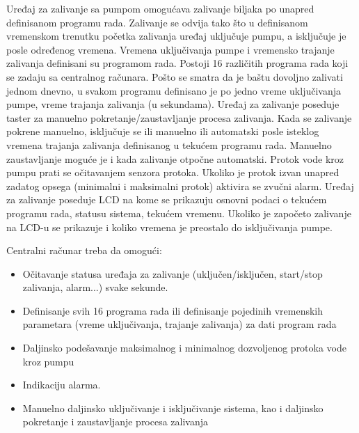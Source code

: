 \documentclass[12pt]{article}
\numberwithin{figure}{section}
\begin{document}
Uređaj za zalivanje sa pumpom omogućava zalivanje biljaka po unapred definisanom programu rada. 
Zalivanje se odvija tako što u definisanom vremenskom trenutku početka zalivanja uređaj uključuje pumpu, a isključuje je posle određenog vremena. 
Vremena uključivanja pumpe i vremensko trajanje zalivanja definisani su programom rada. 
Postoji 16 različitih programa rada koji se zadaju sa centralnog računara.
Pošto se smatra da je baštu dovoljno zalivati jednom dnevno, u svakom programu definisano je po jedno vreme uključivanja pumpe, vreme trajanja zalivanja (u sekundama).
Uređaj za zalivanje poseduje taster za manuelno pokretanje/zaustavljanje procesa zalivanja.
Kada se zalivanje pokrene manuelno, isključuje se ili manuelno ili automatski posle isteklog vremena trajanja zalivanja definisanog u tekućem programu rada.
Manuelno zaustavljanje moguće je i kada zalivanje otpočne automatski. 
Protok vode kroz pumpu prati se očitavanjem senzora protoka. 
Ukoliko je protok izvan unapred zadatog opsega (minimalni i maksimalni protok) aktivira se zvučni alarm.
Uređaj za zalivanje poseduje LCD na kome se prikazuju osnovni podaci o tekućem programu rada, statusu sistema, tekućem vremenu.
Ukoliko je započeto zalivanje na LCD-u se prikazuje i koliko vremena je preostalo do isključivanja pumpe.

Centralni računar treba da omogući:
\begin{itemize}
  \item{Očitavanje statusa uređaja za zalivanje (uključen/isključen, start/stop zalivanja, alarm...) svake sekunde.}
  \item{Definisanje svih 16 programa rada ili definisanje pojedinih vremenskih parametara (vreme uključivanja, trajanje zalivanja) za dati program rada}
  \item{Daljinsko podešavanje maksimalnog i minimalnog dozvoljenog protoka vode kroz pumpu}
  \item{Indikaciju alarma.}
  \item{Manuelno daljinsko uključivanje i isključivanje sistema, kao i daljinsko pokretanje i zaustavljanje procesa zalivanja}
\end{itemize}
\newpage
\end{document}
